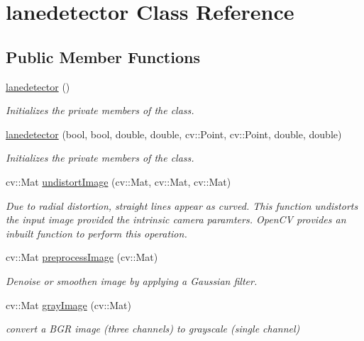 \hypertarget{classlanedetector}{}\section{lanedetector Class Reference}
\label{classlanedetector}
\subsection*{Public Member Functions}
\begin{DoxyCompactItemize}
\item 
\hyperlink{classlanedetector_ac600737bb1e17700b37abdfd9bb73b06}{lanedetector} ()
\begin{DoxyCompactList}\small\item\em Initializes the private members of the class. \end{DoxyCompactList}\item 
\hyperlink{classlanedetector_a968acbf150b7e935953c340a2cf38542}{lanedetector} (bool, bool, double, double, cv\+::\+Point, cv\+::\+Point, double, double)
\begin{DoxyCompactList}\small\item\em Initializes the private members of the class. \end{DoxyCompactList}\item 
cv\+::\+Mat \hyperlink{classlanedetector_ae1c096187d507d6f3e623b9c7a471459}{undistort\+Image} (cv\+::\+Mat, cv\+::\+Mat, cv\+::\+Mat)
\begin{DoxyCompactList}\small\item\em Due to radial distortion, straight lines appear as curved. This function undistorts the input image provided the intrinsic camera paramters. Open\+CV provides an inbuilt function to perform this operation. \end{DoxyCompactList}\item 
cv\+::\+Mat \hyperlink{classlanedetector_a4d92c01545c5c9713c9a70d5903ce181}{preprocess\+Image} (cv\+::\+Mat)
\begin{DoxyCompactList}\small\item\em Denoise or smoothen image by applying a Gaussian filter. \end{DoxyCompactList}\item 
cv\+::\+Mat \hyperlink{classlanedetector_a90b977cb614d19ffa5e56f1b3ef3e8c9}{gray\+Image} (cv\+::\+Mat)
\begin{DoxyCompactList}\small\item\em convert a B\+GR image (three channels) to grayscale (single channel) \end{DoxyCompactList}\item 

\end{DoxyCompactItemize}
